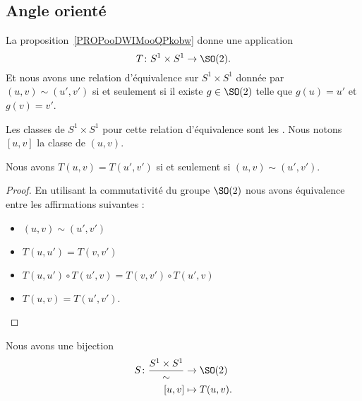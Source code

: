 \subsection{Angle orienté}

La proposition~\ref{PROPooDWIMooQPkobw} donne une application
\begin{equation}
	T\colon S^1\times S^1\to \SO(2).
\end{equation}
Et nous avons une relation d'équivalence sur \( S^1\times S^1\) donnée par \( (u,v)\sim(u',v')\) si et seulement si il existe \( g\in\SO(2)\) telle que \( g(u)=u'\) et \( g(v)=v'\).

\begin{definition}      \label{DEFooVBKIooWlHvod}
	Les classes de \( S^1\times S^1\) pour cette relation d'équivalence sont les . Nous notons \( [u,v]\) la classe de \( (u,v)\).
\end{definition}

\begin{proposition}     \label{PROPooIWJQooGQJBWR}
	Nous avons \( T(u,v)=T(u',v')\) si et seulement si \( (u,v)\sim(u',v')\).
\end{proposition}

\begin{proof}
	En utilisant la commutativité du groupe \( \SO(2)\) nous avons équivalence entre les affirmations suivantes :
	\begin{itemize}
		\item \( (u,v)\sim (u',v')\)
		\item \( T(u,u')=T(v,v')\)
		\item \( T(u,u')\circ T(u',v)=T(v,v')\circ T(u',v)\)
		\item
            \( T(u,v)=T(u',v')\).
	\end{itemize}
\end{proof}

\begin{proposition}
	Nous avons une bijection
	\begin{equation}
		\begin{aligned}
			S\colon \frac{ S^1\times S^1 }{ \sim } & \to \SO(2)      \\
			[u,v]                                  & \mapsto T(u,v).
		\end{aligned}
	\end{equation}
\end{proposition}

